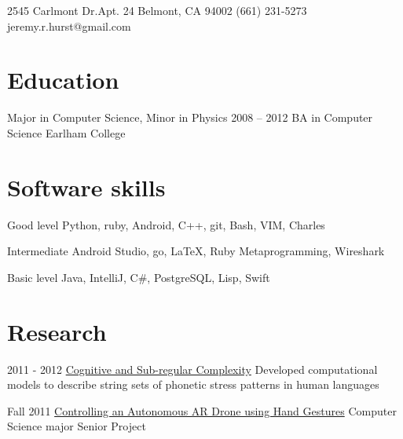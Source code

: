 \documentclass[oldfontcommands]{tccv}
\begin{document}
\personal
    {2545 Carlmont Dr.\newline Apt. 24 \newline Belmont, CA 94002}
    {(661) 231-5273}
    {jeremy.r.hurst@gmail.com}

\section{Education}

\begin{yearlist}

\item[Major in Computer Science, Minor in Physics]{2008 -- 2012}
     {BA in Computer Science}
     {Earlham College}

\end{yearlist}

\section{Software skills}

\begin{factlist}

\item{Good level}
     {Python, ruby, Android, C++, git, Bash, VIM, Charles}

\item{Intermediate}
     {Android Studio, go, \LaTeX, Ruby Metaprogramming, Wireshark}

\item{Basic level}
     {Java, IntelliJ, C\#, PostgreSQL, Lisp, Swift}

\end{factlist}

\section{Research}

\begin{yearlist}
\item{2011 - 2012}
     {\href{http://link.springer.com/chapter/10.1007/978-3-642-39998-5_6\#page-1}{Cognitive and Sub-regular Complexity}}
     {Developed computational models to describe string sets of phonetic stress patterns in human languages}

\item{Fall 2011}
     {\href{https://www.youtube.com/watch?v=69phrToFKyI}{Controlling an Autonomous AR Drone using Hand Gestures}}
     {Computer Science major Senior Project}
\end{yearlist}
\end{document}
